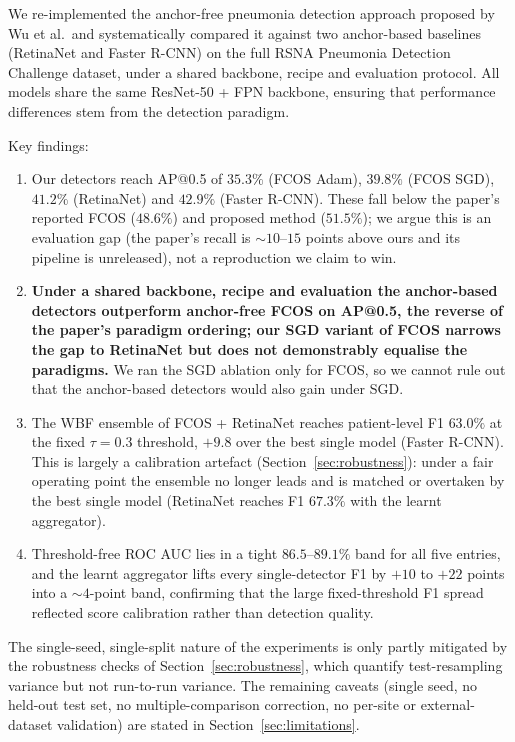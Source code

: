 \documentclass[11pt,a4paper]{article}
\begin{document}
We re-implemented the anchor-free pneumonia detection approach proposed by Wu et al.\ and systematically compared it against two anchor-based baselines (RetinaNet and Faster R-CNN) on the full RSNA Pneumonia Detection Challenge dataset, under a shared backbone, recipe and evaluation protocol. All models share the same ResNet-50 + FPN backbone, ensuring that performance differences stem from the detection paradigm.

Key findings:
\begin{enumerate}[nosep]
    \item Our detectors reach AP@0.5 of $35.3\%$ (FCOS Adam), $39.8\%$ (FCOS SGD), $41.2\%$ (RetinaNet) and $42.9\%$ (Faster R-CNN). These fall below the paper's reported FCOS ($48.6\%$) and proposed method ($51.5\%$); we argue this is an evaluation gap (the paper's recall is $\sim 10$--$15$ points above ours and its pipeline is unreleased), not a reproduction we claim to win.
    \item \textbf{Under a shared backbone, recipe and evaluation the anchor-based detectors outperform anchor-free FCOS on AP@0.5, the reverse of the paper's paradigm ordering; our SGD variant of FCOS narrows the gap to RetinaNet but does not demonstrably equalise the paradigms.} We ran the SGD ablation only for FCOS, so we cannot rule out that the anchor-based detectors would also gain under SGD.
    \item The WBF ensemble of FCOS + RetinaNet reaches patient-level F1 $63.0\%$ at the fixed $\tau=0.3$ threshold, $+9.8$ over the best single model (Faster R-CNN). This is largely a calibration artefact (Section~\ref{sec:robustness}): under a fair operating point the ensemble no longer leads and is matched or overtaken by the best single model (RetinaNet reaches F1 $67.3\%$ with the learnt aggregator).
    \item Threshold-free ROC AUC lies in a tight $86.5$--$89.1\%$ band for all five entries, and the learnt aggregator lifts every single-detector F1 by $+10$ to $+22$ points into a $\sim 4$-point band, confirming that the large fixed-threshold F1 spread reflected score calibration rather than detection quality.
\end{enumerate}

\noindent The single-seed, single-split nature of the experiments is only partly mitigated by the robustness checks of Section~\ref{sec:robustness}, which quantify test-resampling variance but not run-to-run variance. The remaining caveats (single seed, no held-out test set, no multiple-comparison correction, no per-site or external-dataset validation) are stated in Section~\ref{sec:limitations}.
\end{document}
